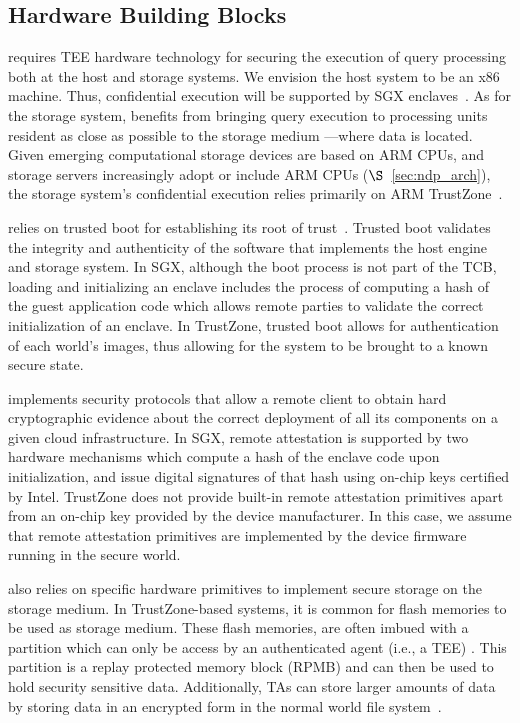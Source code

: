 \subsection{Hardware Building Blocks}
\label{sec:buildingblocks}
 \project{} requires TEE hardware technology for securing the execution of query processing both at the host and storage systems. We envision the host system to be an x86 machine. Thus, confidential execution will be supported by SGX enclaves~\cite{intelsgx}.
As for the storage system, \project{} benefits from bringing query execution to processing units resident as close as possible to the storage medium ---where data is located.
Given emerging computational storage devices are based on ARM CPUs, and storage servers increasingly adopt or include ARM CPUs ($\S$~\ref{sec:ndp_arch}), the storage system's confidential execution relies primarily on ARM TrustZone~\cite{armtz}.

 \project{} relies on trusted boot for establishing its root of trust~\cite{ias,atf}. Trusted boot validates the integrity and authenticity of the software that implements the host engine and storage system. In SGX, although the boot process is not part of the TCB, loading and initializing an enclave includes the process of computing a hash of the guest application code which allows remote parties to validate the correct initialization of an enclave. In TrustZone, trusted boot allows for authentication of each world's images, thus allowing for the system to be brought to a known secure state.

 \project{} implements security protocols that allow a remote client to obtain hard cryptographic evidence about the correct deployment of all its components on a given cloud infrastructure. In SGX, remote attestation is supported by two hardware mechanisms which compute a hash of the enclave code upon initialization, and issue digital signatures of that hash using on-chip keys certified by Intel. TrustZone does not provide built-in remote attestation primitives apart from an on-chip key provided by the device manufacturer. In this case, we assume that remote attestation primitives are implemented by the device firmware running in the secure world.

 \project{} also relies on specific hardware primitives to implement secure storage on the storage medium. In TrustZone-based systems, it is common for flash memories to be used as storage medium. These flash memories, are often imbued with a partition which can only be access by an authenticated agent (i.e., a TEE) \cite{emmcrpmb, opteesecurestorage}. This partition is a replay protected memory block (RPMB) and can then be used to hold security sensitive data. Additionally, TAs can store larger amounts of data by storing data in an encrypted form in the normal world file system~\cite{opteesecurestorage}.


